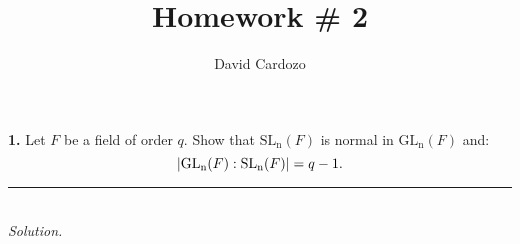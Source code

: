 \documentclass[notitlepage]{report}
\author{David Cardozo}
\title{Homework \# 2}
\begin{document}
\maketitle

\textbf{1.} Let $F$ be a field of order $q$. Show that $ \operatorname{SL_n}(F) $ is normal in $ \operatorname{GL_n}(F) $ and:
\[ \left| \operatorname{GL_n}(F):\operatorname{SL_n}(F) \right| = q-1. \]

\noindent\rule{\textwidth}{1pt}\\[-0.1cm]

\textit{Solution.}


	
\end{document}
